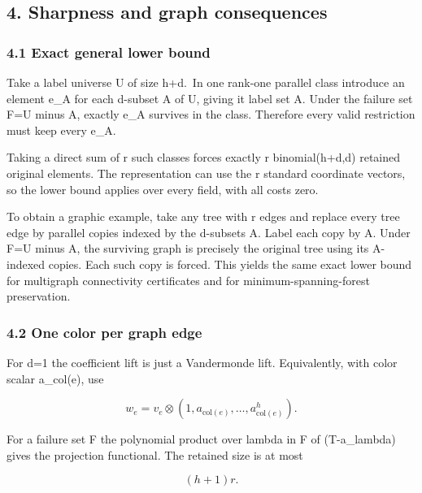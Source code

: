 \hypertarget{af-7a1626f5ae-sharpness-and-graph-consequences}{%
\subsection{4. Sharpness and graph consequences}\label{af-7a1626f5ae-sharpness-and-graph-consequences}}

\hypertarget{af-7a1626f5ae-exact-general-lower-bound}{%
\subsubsection{4.1 Exact general lower bound}\label{af-7a1626f5ae-exact-general-lower-bound}}

Take a label universe U of size h+d.~In one rank-one parallel class introduce an element e\_A for each d-subset A of U, giving it label set A. Under the failure set F=U minus A, exactly e\_A survives in the class. Therefore every valid restriction must keep every e\_A.

Taking a direct sum of r such classes forces exactly r binomial(h+d,d) retained original elements. The representation can use the r standard coordinate vectors, so the lower bound applies over every field, with all costs zero.

To obtain a graphic example, take any tree with r edges and replace every tree edge by parallel copies indexed by the d-subsets A. Label each copy by A. Under F=U minus A, the surviving graph is precisely the original tree using its A-indexed copies. Each such copy is forced. This yields the same exact lower bound for multigraph connectivity certificates and for minimum-spanning-forest preservation.

\hypertarget{af-7a1626f5ae-one-color-per-graph-edge}{%
\subsubsection{4.2 One color per graph edge}\label{af-7a1626f5ae-one-color-per-graph-edge}}

For d=1 the coefficient lift is just a Vandermonde lift. Equivalently, with color scalar a\_col(e), use

\[
w_e=v_e\otimes(1,a_{\mathrm{col}(e)},\ldots,a_{\mathrm{col}(e)}^h).
 \tag{14}
\]

For a failure set F the polynomial product over lambda in F of (T-a\_lambda) gives the projection functional. The retained size is at most

\[
(h+1)r.
 \tag{15}
\]

